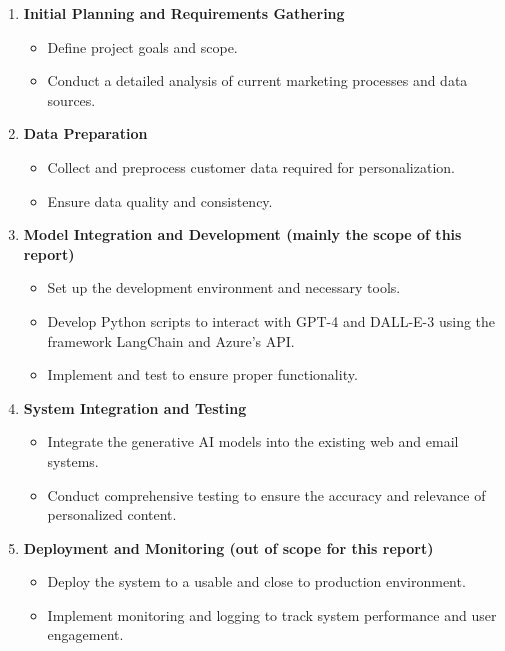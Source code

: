 \documentclass[%
pdftex,
oneside,			%
11pt,				%
parskip=half,		%
headheight = 12pt,	%
headsepline,		%
footsepline,		%
footheight = 16pt,	%
abstracton,		%
DIV=calc,		%
BCOR=8mm,		%
headinclude=false,	%
footinclude=false,	%
listof=totoc,		%
toc=bibliography,	%
]{scrreprt}	%
\begin{document}
        \begin{enumerate}
            \item \textbf{Initial Planning and Requirements Gathering}
            \begin{itemize}
                \item Define project goals and scope.
                \item Conduct a detailed analysis of current marketing processes and data sources.
            \end{itemize}
            \item \textbf{Data Preparation}
            \begin{itemize}
                \item Collect and preprocess customer data required for personalization.
                \item Ensure data quality and consistency.
            \end{itemize}
            \item \textbf{Model Integration and Development (mainly the scope of this report)}
            \begin{itemize}
                \item Set up the development environment and necessary tools.
                \item Develop Python scripts to interact with GPT-4 and DALL-E-3 using the framework LangChain and Azure's API.
                \item Implement and test to ensure proper functionality.
            \end{itemize}
            \item \textbf{System Integration and Testing}
            \begin{itemize}
                \item Integrate the generative AI models into the existing web and email systems.
                \item Conduct comprehensive testing to ensure the accuracy and relevance of personalized content.
            \end{itemize}
            \item \textbf{Deployment and Monitoring (out of scope for this report)}
            \begin{itemize}
                \item Deploy the system to a usable and close to production environment.
                \item Implement monitoring and logging to track system performance and user engagement.

\end{itemize}
\end{enumerate}
\end{document}
